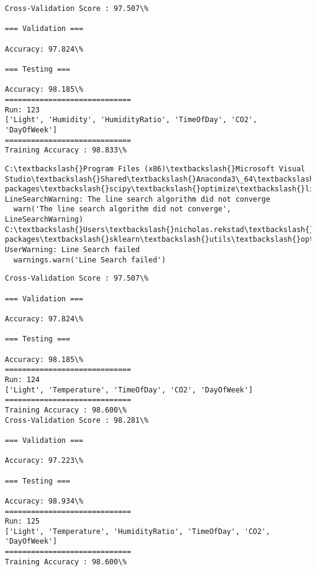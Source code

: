 \documentclass[11pt]{article}
\begin{document}
    \begin{Verbatim}[commandchars=\\\{\}]
Cross-Validation Score : 97.507\%

=== Validation ===

Accuracy: 97.824\%

=== Testing ===

Accuracy: 98.185\%
=============================
Run: 123
['Light', 'Humidity', 'HumidityRatio', 'TimeOfDay', 'CO2', 'DayOfWeek']
=============================
Training Accuracy : 98.833\%

    \end{Verbatim}

    \begin{Verbatim}[commandchars=\\\{\}]
C:\textbackslash{}Program Files (x86)\textbackslash{}Microsoft Visual Studio\textbackslash{}Shared\textbackslash{}Anaconda3\_64\textbackslash{}lib\textbackslash{}site-packages\textbackslash{}scipy\textbackslash{}optimize\textbackslash{}linesearch.py:313: LineSearchWarning: The line search algorithm did not converge
  warn('The line search algorithm did not converge', LineSearchWarning)
C:\textbackslash{}Users\textbackslash{}nicholas.rekstad\textbackslash{}AppData\textbackslash{}Roaming\textbackslash{}Python\textbackslash{}Python36\textbackslash{}site-packages\textbackslash{}sklearn\textbackslash{}utils\textbackslash{}optimize.py:195: UserWarning: Line Search failed
  warnings.warn('Line Search failed')

    \end{Verbatim}

    \begin{Verbatim}[commandchars=\\\{\}]
Cross-Validation Score : 97.507\%

=== Validation ===

Accuracy: 97.824\%

=== Testing ===

Accuracy: 98.185\%
=============================
Run: 124
['Light', 'Temperature', 'TimeOfDay', 'CO2', 'DayOfWeek']
=============================
Training Accuracy : 98.600\%
Cross-Validation Score : 98.281\%

=== Validation ===

Accuracy: 97.223\%

=== Testing ===

Accuracy: 98.934\%
=============================
Run: 125
['Light', 'Temperature', 'HumidityRatio', 'TimeOfDay', 'CO2', 'DayOfWeek']
=============================
Training Accuracy : 98.600\%

    \end{Verbatim}
\end{document}
